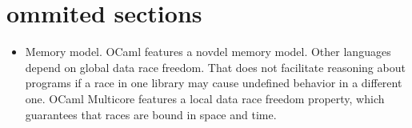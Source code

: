 \documentclass[12pt,a4paper,twoside]{report}
\begin{document}

\section{ommited sections}

\begin{itemize}
    \item Memory model. OCaml features a novdel memory model.
    Other languages depend on global data race freedom. That does not facilitate reasoning about programs if a race in one library may cause undefined behavior in a different one. 
    OCaml Multicore features a local data race freedom property, which guarantees that races are bound in space and time. 
\end{itemize}



\label{lastpage}
\end{document}
